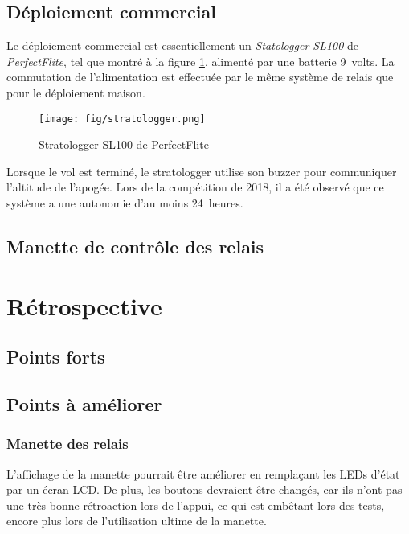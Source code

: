 \subsection{Déploiement commercial}

Le déploiement commercial est essentiellement un \textit{Statologger SL100}
de \textit{PerfectFlite}, tel que montré à la figure \ref{f:stratologger},
alimenté par une batterie 9~volts. La commutation de l'alimentation est
effectuée par le même système de relais que pour le déploiement maison.

\begin{figure}[H]
	\center
	\texttt{[image: fig/stratologger.png]}
	\caption{Stratologger SL100 de PerfectFlite}
	\label{f:stratologger}
\end{figure}

Lorsque le vol est terminé, le stratologger utilise son buzzer pour communiquer
l'altitude de l'apogée. Lors de la compétition de 2018, il a été observé que
ce système a une autonomie d'au moins 24~heures.

\subsection{Manette de contrôle des relais}



\section{Rétrospective}

\subsection{Points forts}



\subsection{Points à améliorer}

\subsubsection{Manette des relais}

L'affichage de la manette pourrait être améliorer en remplaçant les LEDs d'état
par un écran LCD. De plus, les boutons devraient être changés, car ils n'ont
pas une très bonne rétroaction lors de l'appui, ce qui est embêtant lors des
tests, encore plus lors de l'utilisation ultime de la manette.

